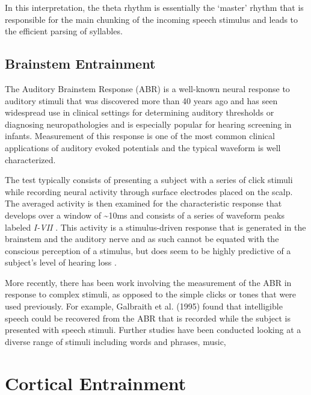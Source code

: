 \documentclass[titlepage]{article}
\begin{document}
    In this interpretation, the theta rhythm is essentially the `master' rhythm that is responsible
    for the main chunking of the incoming speech stimulus and leads to the efficient parsing of
    syllables.

  \subsection{Brainstem Entrainment} \label{brainstemEntrainment}

    The Auditory Brainstem Response (ABR) is a well-known neural response
    to auditory stimuli that was discovered more than 40 years ago \cite{Jewett1971,Jewett1970}
    and has seen widespread use in clinical settings for determining auditory thresholds
    or diagnosing neuropathologies \cite{Skoe2010} and is especially popular for hearing screening in infants.
    Measurement of this response is one of the
    most common clinical applications of auditory evoked potentials and the typical waveform is well
    characterized.

    The test typically consists of presenting a subject with a series of click stimuli while recording
    neural activity through surface electrodes placed on the scalp. The averaged activity is then examined
    for the characteristic response that develops over a window of \textasciitilde 10ms and consists of
    a series of waveform peaks labeled \textit{I-VII} \cite{Sininger1993,Bhattacharyya2017}. This activity
    is a stimulus-driven response that is generated in the brainstem and the auditory nerve and as such
    cannot be equated with the conscious perception of a stimulus, but does seem to be highly predictive of
    a subject's level of hearing loss \cite{Sininger1993}.

    More recently, there has been work involving the measurement of the ABR in response to complex
    stimuli, as opposed to the simple clicks or tones that were used previously.
    For example, Galbraith et al. (1995) \cite{Galbraith1995} found that intelligible
    speech could be recovered from the ABR that is recorded while the subject is presented with
    speech stimuli. Further studies have been conducted looking at a diverse range of stimuli
    including words and phrases, music,

\section{Cortical Entrainment} \label{corticalEntrainment}
\end{document}
